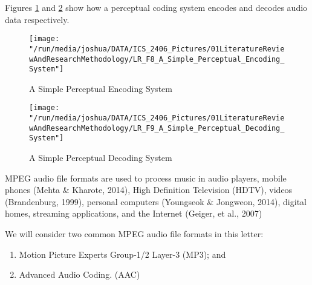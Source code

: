 \documentclass[12pt,svgnames,smaller]{article} %
\begin{document}
	Figures \ref{fig:LiteratureReview-Figure8} and \ref{fig:LiteratureReview-Figure9} show how a perceptual coding system encodes and decodes audio data respectively.
	
	\begin{figure}
		\centering
		\texttt{[image: "/run/media/joshua/DATA/ICS\_2406\_Pictures/01LiteratureReviewAndResearchMethodology/LR\_F8\_A\_Simple\_Perceptual\_Encoding\_System"]}
		\caption{A Simple Perceptual Encoding System}
		\label{fig:LiteratureReview-Figure8}
	\end{figure}
	
	\begin{figure}
		\centering
		\texttt{[image: "/run/media/joshua/DATA/ICS\_2406\_Pictures/01LiteratureReviewAndResearchMethodology/LR\_F9\_A\_Simple\_Perceptual\_Decoding\_System"]}
		\caption{A Simple Perceptual Decoding System}
		\label{fig:LiteratureReview-Figure9}
	\end{figure}
	
	MPEG audio file formats are used to process music in audio players, mobile phones (Mehta \& Kharote, 2014), High Definition Television (HDTV), videos (Brandenburg, 1999), personal computers (Youngseok \& Jongweon, 2014), digital homes, streaming applications, and the Internet (Geiger, et al., 2007) 
	
	We will consider two common MPEG audio file formats in this letter:
	
	\begin{enumerate}
		\item Motion Picture Experts Group-1/2 Layer-3 (MP3); and
		\item Advanced Audio Coding. (AAC) 
	\end{enumerate}
	
\end{document}
